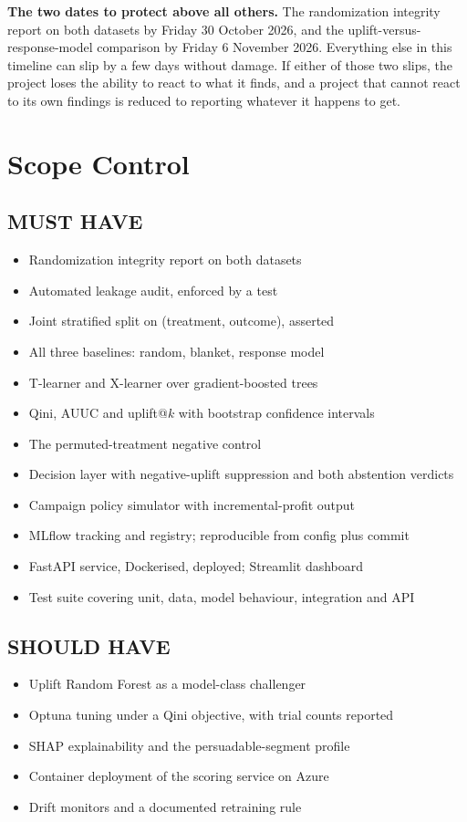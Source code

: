 \documentclass[11pt,a4paper]{article}
\begin{document}
\begin{alertbox}
\textbf{The two dates to protect above all others.} The randomization integrity report on both
datasets by Friday 30 October 2026, and the uplift-versus-response-model comparison by Friday
6 November 2026. Everything else in this timeline can slip by a few days without damage. If either
of those two slips, the project loses the ability to react to what it finds, and a project that
cannot react to its own findings is reduced to reporting whatever it happens to get.
\end{alertbox}
\section{Scope Control}
\label{sec:scope}

\subsection{MUST HAVE}
\begin{itemize}
\item Randomization integrity report on both datasets
\item Automated leakage audit, enforced by a test
\item Joint stratified split on (treatment, outcome), asserted
\item All three baselines: random, blanket, response model
\item T-learner and X-learner over gradient-boosted trees
\item Qini, AUUC and uplift@$k$ with bootstrap confidence intervals
\item The permuted-treatment negative control
\item Decision layer with negative-uplift suppression and both abstention verdicts
\item Campaign policy simulator with incremental-profit output
\item MLflow tracking and registry; reproducible from config plus commit
\item FastAPI service, Dockerised, deployed; Streamlit dashboard
\item Test suite covering unit, data, model behaviour, integration and API
\end{itemize}

\subsection{SHOULD HAVE}
\begin{itemize}
\item Uplift Random Forest as a model-class challenger
\item Optuna tuning under a Qini objective, with trial counts reported
\item SHAP explainability and the persuadable-segment profile
\item Container deployment of the scoring service on Azure
\item Drift monitors and a documented retraining rule
\end{itemize}
\end{document}
